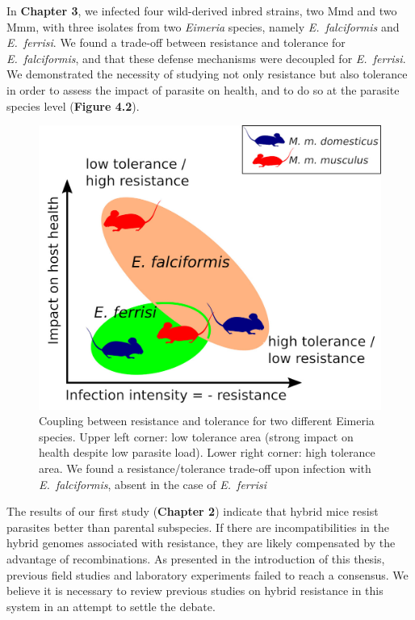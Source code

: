 \par
In \textbf{Chapter 3}, we infected four wild-derived inbred strains, two Mmd and two Mmm, with three isolates from two \textit{Eimeria} species, namely \textit{E.~falciformis} and \textit{E.~ferrisi}. We found a trade-off between resistance and tolerance for \textit{E.~falciformis}, and that these defense mechanisms were decoupled for \textit{E.~ferrisi}. We demonstrated the necessity of studying not only resistance but also tolerance in order to assess the impact of parasite on health, and to do so at the parasite species level (\textbf{Figure 4.2}). 

\begin{figure}[H]
	\centering
	\includegraphics[width=.5\linewidth,height=\textheight,keepaspectratio]{images/4discussion/Figure4.jpeg}
	\caption{Coupling between resistance and tolerance for two different Eimeria species. Upper left corner: low tolerance area (strong impact on health despite low parasite load). Lower right corner: high tolerance area. We found a resistance/tolerance trade-off upon infection with \textit{E.~falciformis}, absent in the case of \textit{E.~ferrisi}}
\end{figure}

The results of our first study (\textbf{Chapter 2}) indicate that hybrid mice resist parasites better than parental subspecies. If there are incompatibilities in the hybrid genomes associated with resistance, they are likely compensated by the advantage of recombinations. As presented in the introduction of this thesis, previous field studies and laboratory experiments failed to reach a consensus. We believe it is necessary to review previous studies on hybrid resistance in this system in an attempt to settle the debate.

